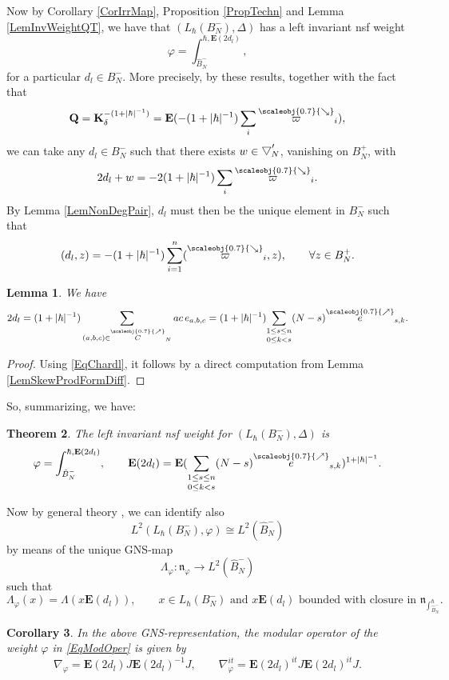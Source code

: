 \documentclass[11pt, reqno]{amsart}
\newtheorem{theorem}{Theorem}[section]
\newtheorem{lemma}[theorem]{Lemma}
\newtheorem{cor}[theorem]{Corollary}
\theoremstyle{definition}
\numberwithin{equation}{section}
\newcommand{\Qb}{\mathbf{Q}}
\newcommand{\Bor}{B}
\newcommand{\nears}{\scaleobj{0.7}{\nearrow}}
\newcommand{\sears}{\scaleobj{0.7}{\searrow}}
\newcommand{\nee}{\overset{\nears}{e}}
\newcommand{\neC}{\overset{\nears}{C}}
\newcommand{\sevarpi}{\overset{\sears}{\varpi}}
\newcommand{\Eb}{\mathbf{E}}
\newcommand{\Kb}{\mathbf{K}}
\newcommand{\wbtd}[1]{\raisebox{\depth}{$\bigtriangledown'$\!\!}_{#1}}
\newcommand{\mfn}{\mathfrak{n}}
\begin{document}
Now by Corollary \ref{CorIrrMap}, Proposition \ref{PropTechn} and Lemma \ref{LemInvWeightQT}, we have that $(L_{\hbar}(\Bor_N^-),\Delta)$ has a left invariant nsf weight 
\[
\varphi = \int_{\hat{\Bor}_N^-}^{\hbar,\Eb(2d_l)},
\]
for a particular $d_l \in \Bor_N^-$. More precisely, by these results, together with the fact that 
\[
\Qb = \Kb_{\delta}^{-(1+|\hbar|^{-1})} = \Eb(-(1+|\hbar|^{-1})\sum_i \sevarpi_i), 
\] 
we can take any $d_l \in \Bor_N^-$ such that there exists $w\in \wbtd{N}$, vanishing on $\Bor_N^+$, with 
\[
2d_l + w = -2(1+|\hbar|^{-1})\sum_i \sevarpi_i.
\]
By Lemma \ref{LemNonDegPair}, $d_l$ must then be the unique element in $\Bor_N^-$ such that 
\begin{equation}\label{EqChardl}
(d_l,z) = -(1+|\hbar|^{-1})\sum_{i=1}^n (\sevarpi_i,z),\qquad \forall z\in \Bor_N^+.
\end{equation}

\begin{lemma}
We have 
\[
2d_l = (1+|\hbar|^{-1})\sum_{(a,b,c)\in \neC_N} ac\,e_{a,b,c} = (1+|\hbar|^{-1})\underset{0\leq k<s}{\sum_{1\leq s\leq n}} (N-s)\nee_{s,k}. 
\]
\end{lemma} 
\begin{proof}
Using \eqref{EqChardl}, it follows by a direct computation from Lemma \ref{LemSkewProdFormDiff}.
\end{proof}

So, summarizing, we have:
\begin{theorem}\label{TheoLeftNSF}
The left invariant nsf weight for $(L_{\hbar}(\Bor_N^-),\Delta)$ is 
\begin{equation}\label{EqModOper}
\varphi = \int_{\hat{\Bor}_N^-}^{\hbar,\Eb(2d_l)},\qquad \Eb(2d_l) =  \Eb(\underset{0\leq k<s}{\sum_{1\leq s\leq n}} (N-s)\nee_{s,k})^{1+|\hbar|^{-1}}. 
\end{equation}
\end{theorem}

Now by general theory \cite{PT73,Vae01}, we can identify also 
\begin{equation}\label{EqIdentGNSvNTwist}
L^2(L_{\hbar}(\Bor_N^-),\varphi)\cong L^2(\hat{\Bor}_N^-)
\end{equation}
by means of the unique GNS-map 
\[
\Lambda_{\varphi}\colon  \mfn_{\varphi} \rightarrow L^2(\hat{\Bor}_N^-)
\]
such that 
\[
\Lambda_{\varphi}(x) = \Lambda(x\Eb(d_l)),\qquad x\in L_{\hbar}(\Bor_{N}^-) \textrm{ and }x\Eb(d_l)\textrm{ bounded with closure in }\mfn_{\int_{\hat{\Bor}_N^-}^{\hbar}}.
\]
\begin{cor}
In the above GNS-representation, the modular operator of the weight $\varphi$ in \eqref{EqModOper} is given by 
\[
\nabla_{\varphi} = \Eb(2d_l)J \Eb(2d_l)^{-1}J,\qquad \nabla_{\varphi}^{it} =  \Eb(2d_l)^{it}J \Eb(2d_l)^{it}J.
\]
\end{cor}
\end{document}
